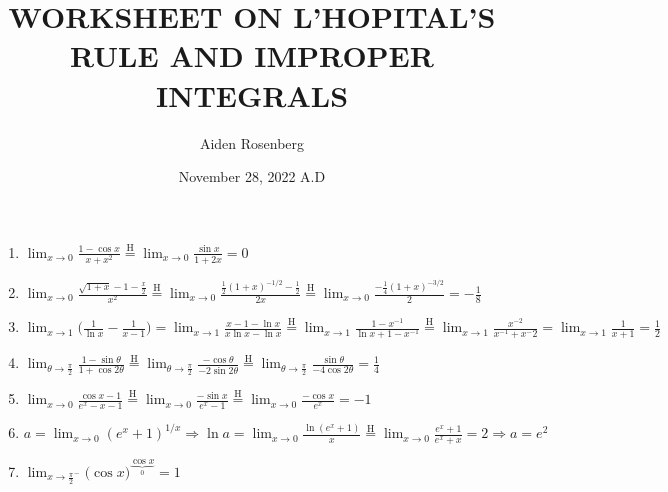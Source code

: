 \documentclass[12pt]{article}
\title{WORKSHEET ON L’HOPITAL’S RULE AND IMPROPER INTEGRALS}
\author{Aiden Rosenberg}
\date{November 28, 2022 A.D}
\begin{document}
\newcommand*\Heq{\overset{\mathrm{H}}{=}}
\maketitle
\begin{enumerate}
    \item $\lim_{x \to 0} \frac{1-\cos x}{x+x^2} \Heq \lim_{x\to 0} \frac{\sin x}{1+2x} = \boxed{0}$
    \item $\lim_{x \to 0} \frac{\sqrt{1+x}-1 -\frac{x}{2}}{x^2} \Heq \lim_{x \to 0} \frac{\frac{1}{2}(1+x)^{-1/2}-\frac{1}{2}}{2x} \Heq \lim_{x \to 0} \frac{-\frac{1}{4}(1+x)^{-3/2}}{2}  = \boxed {-\frac{1}{8}}$
    \item $\lim_{x\to 1} \biggr(\frac{1}{\ln x} - \frac{1}{x-1}\biggr) = \lim_{x\to 1} \frac{x-1-\ln x}{x\ln x - \ln x} \Heq \lim_{x\to 1} \frac{1-x^{-1}}{\ln x +1 - x^{-1}} \Heq \lim_{x\to 1}\frac{x^{-2}}{x^{-1}+{x^-2}}= \lim_{x\to 1} \frac{1}{x+1} = \boxed{\frac{1}{2}}$
    \item $\lim_{\theta \to \frac{\pi}{2}} \frac{1-\sin \theta}{1+\cos 2\theta} \Heq \lim_{\theta \to \frac{\pi}{2}} \frac{-\cos \theta}{-2\sin 2\theta} \Heq \lim_{\theta \to \frac{\pi}{2}} \frac{\sin \theta}{-4\cos 2 \theta} = \boxed{\frac{1}{4}}$
    \item $\lim_{x\to 0 } \frac{\cos x -1}{e^x-x-1} \Heq \lim_{x\to 0 } \frac{-\sin x}{e^x-1} \Heq \lim_{x\to 0 } \frac{-\cos x}{e^x}= \boxed{-1}$
    \item $a = \lim_{x\to 0 } (e^x+1)^{1/x} \Longrightarrow \ln a = \lim_{x\to 0 } \frac{\ln(e^x+1)}{x} \Heq \lim_{x\to 0 } \frac{e^x+1}{e^x+x} = 2 \Longrightarrow a= \boxed{e^2}$
    \item $\lim_{x\to \frac{\pi}{2}^-} \big(\cos x\big)^ {\underbrace{\cos x}_{0}}
    = \boxed{1}$
\end{enumerate}
\end{document}
